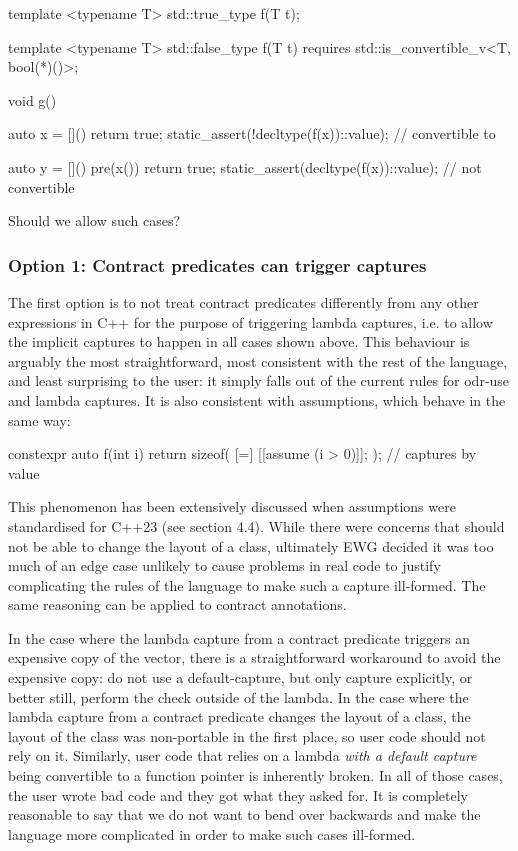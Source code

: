 \begin{codeblock}
template <typename T>
std::true_type f(T t);

template <typename T>
std::false_type f(T t)
requires std::is_convertible_v<T, bool(*)()>;

void g() {
  auto x = []() { return true; }
  static_assert(!decltype(f(x))::value); // convertible to 
  
  auto y = []() pre(x()) { return true; }
  static_assert(decltype(f(x))::value);  // not convertible
}
\end{codeblock}

Should  we allow such cases?

\subsubsection{Option 1: Contract predicates can trigger captures}

The first option is to not treat contract predicates differently from any other expressions in C++ for the purpose of triggering lambda captures, i.e. to allow the implicit captures to happen in all cases shown above. This behaviour is arguably the most straightforward, most consistent with the rest of the language, and least surprising to the user: it simply falls out of the current rules for odr-use and lambda captures. It is also consistent with assumptions, which behave in the same way:

\begin{codeblock}
constexpr auto f(int i) {
  return sizeof( [=] { [[assume (i > 0)]]; } );   // captures  by value
}
\end{codeblock}

This phenomenon has been extensively discussed when assumptions were standardised for C++23 (see \cite{P1774R8} section 4.4). While there were concerns that \tcode{[[assume]]} should not be able to change the layout of a class, ultimately EWG decided it was too much of an edge case unlikely to cause problems in real code to justify complicating the rules of the language to make such a capture ill-formed. The same reasoning can be applied to contract annotations.

In the case where the lambda capture from a contract predicate triggers an expensive copy of the vector, there is a straightforward workaround to avoid the expensive copy: do not use a default-capture, but only capture  explicitly, or better still, perform the check outside of the lambda. In the case where the lambda capture from a contract predicate changes the layout of a class, the layout of the class was non-portable in the first place, so user code should not rely on it. Similarly, user code that relies on a lambda \emph{with a default capture} being convertible to a function pointer is inherently broken. In all of those cases, the user wrote bad code and they got what they asked for. It is completely reasonable to say that we do not want to bend over backwards and make the language more complicated in order to make such cases ill-formed.

